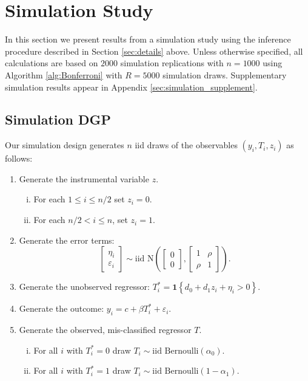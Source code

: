 \section{Simulation Study}
\label{sec:simulation}

In this section we present results from a simulation study using the inference procedure described in Section \ref{sec:details} above.
Unless otherwise specified, all calculations are based on $2000$ simulation replications with $n = 1000$ using Algorithm \ref{alg:Bonferroni} with $R = 5000$ simulation draws.
Supplementary simulation results appear in Appendix \ref{sec:simulation_supplement}.

\subsection{Simulation DGP}
\label{sec:DGP}
Our simulation design generates $n$ iid draws of the observables $(y_i, T_i, z_i)$ as follows:
\begin{enumerate}
  \item Generate the instrumental variable $z$.
    \begin{enumerate}[(i)]
      \item For each $1 \leq i \leq n/2$ set $z_i = 0$.
      \item For each $n/2 < i \leq n$, set $z_i = 1$.
    \end{enumerate}
  \item Generate the error terms: 
    \[
      \left[
      \begin{array}{c}
        \eta_i \\ \varepsilon_i
      \end{array}
    \right] \sim \mbox{iid N}\left( \left[
\begin{array}{c}
  0 \\ 0
\end{array}
\right], \left[
\begin{array}{cc}
  1 & \rho \\
  \rho & 1
\end{array}
\right]\right).
\]
  \item Generate the unobserved regressor: $T^*_i = \mathbf{1}\left\{ d_0 + d_1 z_i + \eta_i > 0 \right\}$.
  \item Generate the outcome: $y_i = c + \beta T_i^* + \varepsilon_i$.  
  \item Generate the observed, mis-classified regressor $T$.
    \begin{enumerate}[(i)]
      \item For all $i$ with $T^*_i = 0$ draw $T_i \sim \mbox{iid Bernoulli}(\alpha_0)$. 
      \item For all $i$ with $T^*_i = 1$ draw $T_i \sim \mbox{iid Bernoulli}(1 - \alpha_1)$.
    \end{enumerate}
\end{enumerate}

